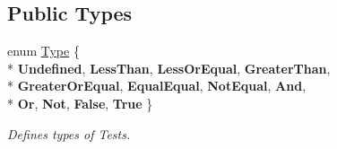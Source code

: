 \subsection*{Public Types}
\begin{DoxyCompactItemize}
\item 
\hypertarget{classTest_a9e5d00cf02fb05573a6f97d14ebc154a}{}enum \hyperlink{classTest_a9e5d00cf02fb05573a6f97d14ebc154a}{Type} \{ \\*
{\bfseries Undefined}, 
{\bfseries Less\+Than}, 
{\bfseries Less\+Or\+Equal}, 
{\bfseries Greater\+Than}, 
\\*
{\bfseries Greater\+Or\+Equal}, 
{\bfseries Equal\+Equal}, 
{\bfseries Not\+Equal}, 
{\bfseries And}, 
\\*
{\bfseries Or}, 
{\bfseries Not}, 
{\bfseries False}, 
{\bfseries True}
 \}\label{classTest_a9e5d00cf02fb05573a6f97d14ebc154a}

\begin{DoxyCompactList}\small\item\em Defines types of Tests. \end{DoxyCompactList}\end{DoxyCompactItemize}
